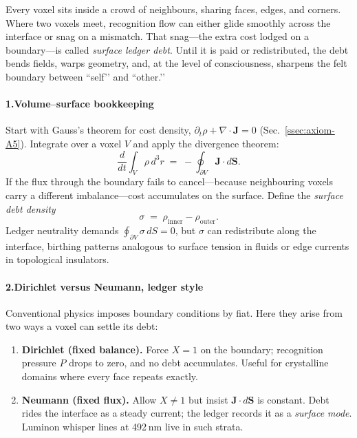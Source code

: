 \documentclass[11pt,oneside]{book}
\begin{document}
Every voxel sits inside a crowd of neighbours, sharing faces, edges, and corners.  
Where two voxels meet, recognition flow can either glide smoothly across the interface or snag on a mismatch.  
That snag—the extra cost lodged on a boundary—is called \emph{surface ledger debt}.  
Until it is paid or redistributed, the debt bends fields, warps geometry, and, at the level of consciousness, sharpens the felt boundary between “self’’ and “other.’’

\paragraph*{1.\;Volume–surface bookkeeping}

Start with Gauss’s theorem for cost density,
\(
\partial_t\rho + \nabla\!\cdot\!\mathbf J = 0
\)
(Sec.~\ref{ssec:axiom-A5}).  
Integrate over a voxel $V$ and apply the divergence theorem:
\[
  \frac{d}{dt}\!\int_{V}\rho\,d^{3}r
  \;=\;
  -\oint_{\partial V}\!\mathbf J\!\cdot\!d\mathbf S.
\]
If the flux through the boundary fails to cancel—because neighbouring
voxels carry a different imbalance—cost accumulates on the surface.
Define the \emph{surface debt density}
\[
  \sigma
  \;=\;
  \rho_{\text{inner}} - \rho_{\text{outer}}.
\]
Ledger neutrality demands
\(
\oint_{\partial V}\sigma\,dS = 0
\),
but $\sigma$ can redistribute along the interface, birthing patterns
analogous to surface tension in fluids or edge currents in topological
insulators.

\paragraph*{2.\;Dirichlet versus Neumann, ledger style}

Conventional physics imposes boundary conditions by fiat.  
Here they arise from two ways a voxel can settle its debt:

\begin{enumerate}
\item \textbf{Dirichlet (fixed balance).}  
  Force $X=1$ on the boundary; recognition pressure $P$ drops to zero,
  and no debt accumulates.  
  Useful for crystalline domains where every face repeats exactly.
\item \textbf{Neumann (fixed flux).}  
  Allow $X\ne1$ but insist $\mathbf J\!\cdot\!d\mathbf S$ is constant.
  Debt rides the interface as a steady current; the ledger records it as
  a \emph{surface mode}.  
  Luminon whisper lines at 492 nm live in such strata.
\end{enumerate}
\end{document}
